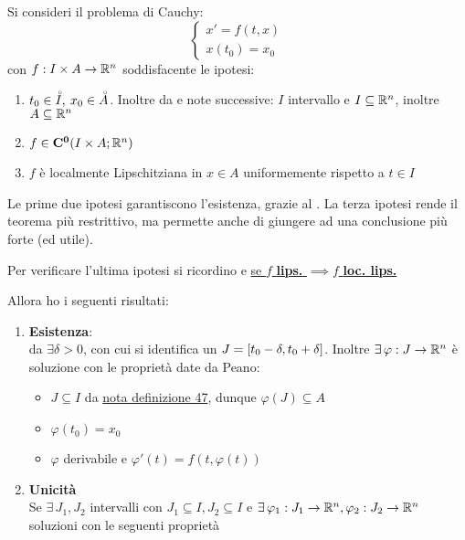 \begin{theorem}
	\label{teo:cau_locale_part_1}
	Si consideri il problema di Cauchy:
	$$\begin{cases}x'=f(t,x)\\x(t_0)=x_0\end{cases}$$
	con $f:I\times A \to \mathbb{R}^n$ soddisfacente le ipotesi:
	\begin{enumerate}
		\item $t_0\in \accentset{\circ}{I},\:x_0\in \accentset{\circ}{A}$. Inoltre da  e note successive: $I$ intervallo e $I\subseteq \mathbb{R}^n$, inoltre $A\subseteq \mathbb{R}^n$
		\item $f\in \mathbf{C^{0}}(I\times A; \mathbb{R}^n)$ 
		\item $f$ è localmente Lipschitziana in $x\in A$ uniformemente rispetto a $t\in I$
	\end{enumerate}
	\begin{note}
		Le prime due ipotesi garantiscono l'esistenza, grazie al . La terza ipotesi rende il teorema più restrittivo, ma permette anche di giungere ad una conclusione più forte (ed utile).
	\end{note}
	\vspace*{-5ex}
	\begin{note}
		Per verificare l'ultima ipotesi si ricordino  e \hyperlink{note:if_lips_then_loclips}{se $f$ \textbf{lips.} $\implies f$ \textbf{loc. lips.}}
	\end{note}
	Allora ho i seguenti risultati:
	\begin{enumerate}
		\item \textbf{Esistenza}:\\
		da  $\exists \delta>0$, con cui si identifica un $J=\left[t_0-\delta,t_0+\delta\right]$. Inoltre $\exists\,\varphi : J \to \mathbb{R}^n$ è soluzione con le proprietà date da Peano:
		\begin{itemize}
			\item $J\subseteq I$ da \hyperlink{note:diff_eq_sol_definit_set}{nota definizione 47}, dunque $\varphi(J)\subseteq A$
			\item $\varphi(t_0)=x_0$
			\item $\varphi$ derivabile e $\varphi'(t)=f(t,\varphi(t))$
		\end{itemize}
		\item \textbf{Unicità}\\
		Se $\exists\,J_1,J_2$ intervalli con $J_1\subseteq I,J_2\subseteq I$ e $\exists\,\varphi_1:J_1\to \mathbb{R}^n, \varphi_2:J_2\to \mathbb{R}^n$ soluzioni con le seguenti proprietà

\end{enumerate}
\end{theorem}
